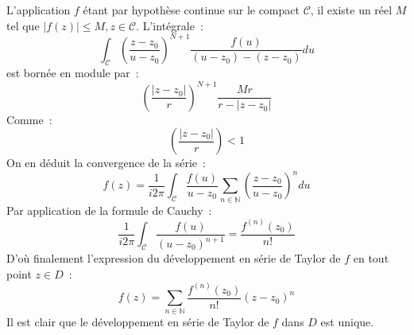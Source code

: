 L'application $f$ étant par hypothèse continue sur le compact $\mathcal{C}$,
il existe un réel $M$ tel que $|f(z)|\leq M, z \in \mathcal{C}$. L'intégrale~:
\[
\int_{\mathcal{C}} \left ( \frac{z-z_0}{u-z_0}
\right )^{N+1} \frac{f(u)}{(u-z_0)-(z-z_0)} du 
\]
est bornée en module par~:
\[
\left ( \frac{|z-z_0|}{r}
\right )^{N+1} \frac{Mr}{r-|z-z_0|}
\]
Comme~:
\[
\left ( \frac{|z-z_0|}{r}
\right ) < 1
\]
On en déduit la convergence de la série~:
\[
f(z) = \frac{1}{i2\pi}\int_{\mathcal{C}}
\frac{f(u)}{u-z_0}\sum_{n \in \mathbb{N}} \left ( \frac{z-z_0}{u-z_0} \right )^n
du
\]
Par application de la formule de Cauchy~:
\[
\frac{1}{i2\pi} \int_{\mathcal{C}}
\frac{f(u)}{(u-z_0)^{n+1}} = \frac{f^{(n)}(z_0)}{n!}
\]
D'où finalement l'expression du développement en série de Taylor de $f$ en tout
point $z \in D$~:
\[
f(z)= \sum_{n\in \mathbb{N}} \frac{f^{(n)}(z_0)}{n!} (z-z_0)^n
\]
Il est clair que le développement en série de Taylor de $f$ dans $D$ est
unique.

